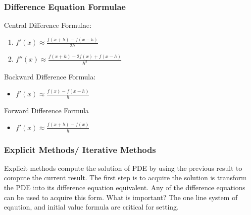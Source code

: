 \subsubsection {Difference Equation Formulae}

Central Difference Formulae:
\begin{enumerate}
\item $f'(x) \approx \frac{f(x+h) - f(x-h)}{2h} $
\item $f''(x) \approx \frac {f(x+h) -2f(x)+ f(x-h)}{h^2}$
\end{enumerate}

Backward Difference Formula: 
\begin{itemize}
\item $f'(x) \approx \frac{f(x) - f(x-h)}{h} $
\end{itemize}

Forward Difference Formula
\begin{itemize}
\item $f'(x) \approx \frac{f(x+h) - f(x)}{h} $
\end{itemize}


\subsubsection {Explicit Methods/ Iterative Methods}
Explicit methods compute the solution of PDE by using the previous result to compute the current result.  The first step is to acquire the solution is transform the PDE into its difference equation equivalent.   Any of the difference equations can be used to acquire this form.  What is important?  The one line system of eqaution, and initial value formula are critical for setting. %


